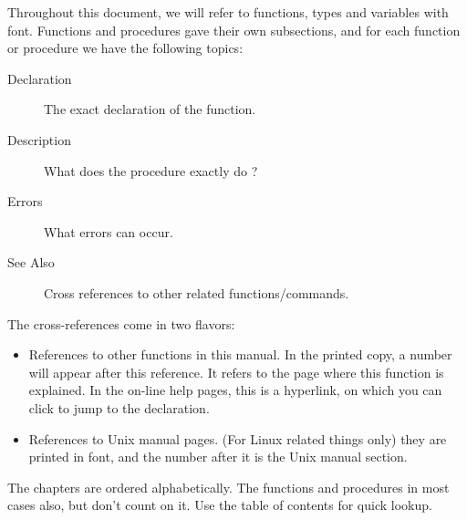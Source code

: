 Throughout this document, we will refer to functions, types and variables
with  font. Functions and procedures gave their own
subsections, and for each function or procedure we have the following
topics:
\begin{description}
\item [Declaration] The exact declaration of the function.
\item [Description] What does the procedure exactly do ?
\item [Errors] What errors can occur.
\item [See Also] Cross references to other related functions/commands.
\end{description}
The cross-references come in two flavors:
\begin{itemize}
\item References to other functions in this manual. In the printed copy, a
number will appear after this reference. It refers to the page where this
function is explained. In the on-line help pages, this is a hyperlink, on
which you can click to jump to the declaration.
\item References to Unix manual pages. (For Linux related things only) they
are printed in  font, and the number after it is the Unix
manual section.
\end{itemize}
The chapters are ordered alphabetically. The functions and procedures in
most cases also, but don't count on it. Use the table of contents for quick
lookup.

%
%

























\printindex
